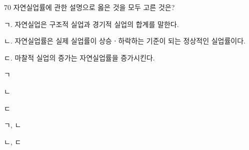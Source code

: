 \begin{question}{70}
자연실업률에 관한 설명으로 옳은 것을 모두 고른 것은?
\begin{framedtext}
ㄱ. 자연실업은 구조적 실업과 경기적 실업의 합계를 말한다. \par
ㄴ. 자연실업률은 실제 실업률이 상승ㆍ하락하는 기준이 되는 정상적인 실업률이다. \par
ㄷ. 마찰적 실업의 증가는 자연실업률을 증가시킨다. \par
\end{framedtext}
\begin{choices}
  \item ㄱ
  \item ㄴ
  \item ㄷ
  \item ㄱ, ㄴ
  \item ㄴ, ㄷ
\end{choices}
\end{question}
